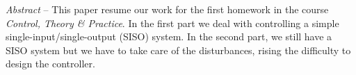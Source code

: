 \begin{bfseries}
\emph{Abstract} -- 
This paper resume our work for the first homework in the course \emph{Control, Theory \& Practice}. 
In the first part we deal with controlling a simple single-input/single-output (SISO) system. 
In the second part, we still have a SISO system but we have to take care of the disturbances, rising the difficulty to design the controller.
\end{bfseries}
